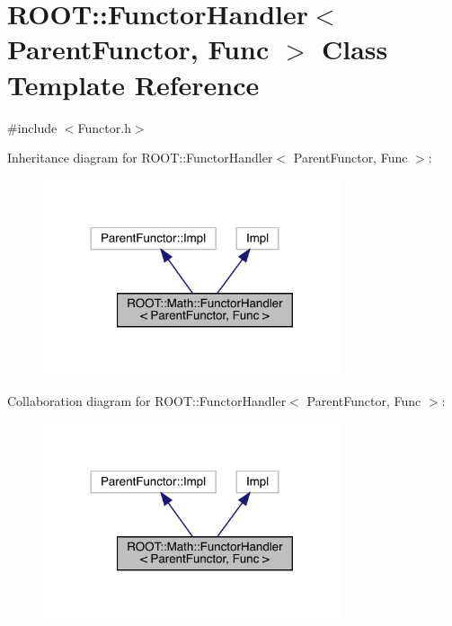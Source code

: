 \hypertarget{classROOT_1_1Math_1_1FunctorHandler}{}\section{R\+O\+OT\+:\+:Functor\+Handler$<$ Parent\+Functor, Func $>$ Class Template Reference}
\label{classROOT_1_1Math_1_1FunctorHandler}


{\ttfamily \#include $<$Functor.\+h$>$}



Inheritance diagram for R\+O\+OT\+:\+:Functor\+Handler$<$ Parent\+Functor, Func $>$\+:\nopagebreak
\begin{figure}[H]
\begin{center}
\leavevmode
\includegraphics[width=248pt]{d9/dc5/classROOT_1_1Math_1_1FunctorHandler__inherit__graph}
\end{center}
\end{figure}


Collaboration diagram for R\+O\+OT\+:\+:Functor\+Handler$<$ Parent\+Functor, Func $>$\+:\nopagebreak
\begin{figure}[H]
\begin{center}
\leavevmode
\includegraphics[width=248pt]{d5/da4/classROOT_1_1Math_1_1FunctorHandler__coll__graph}
\end{center}
\end{figure}
